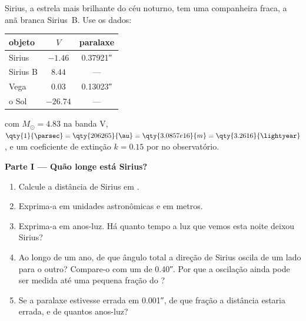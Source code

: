 \begin{problem}
\label{pb:b1:observing-the-sky:1}
Sirius, a estrela mais brilhante do céu noturno, tem uma companheira fraca, a anã branca Sirius~B. Use os dados:
\begin{center}
\small
\begin{tabular}{lcc}
\hline
objeto & $V$ & paralaxe \\
\hline
Sirius & $-1.46$ & \ang{;;0.37921} \\
Sirius B & $8.44$ & --- \\
Vega & $0.03$ & \ang{;;0.13023} \\
o Sol & $-26.74$ & --- \\
\hline
\end{tabular}
\end{center}
com $M_\odot = 4.83$ na banda V, $\qty{1}{\parsec} = \qty{206265}{\au} =
\qty{3.0857e16}{m} = \qty{3.2616}{\lightyear}$, e um coeficiente de extinção $k = 0.15$ por  no observatório.

\medskip
\noindent\textbf{Parte I --- Quão longe está Sirius?}
\begin{enumerate}
  \item Calcule a distância de Sirius em .
  \item Exprima-a em unidades astronômicas e em metros.
  \item Exprima-a em anos-luz. Há quanto tempo a luz que vemos esta noite deixou Sirius?
  \item Ao longo de um ano, de que ângulo total a direção de Sirius oscila de um lado para o outro? Compare-o com um  de \ang{;;0.40}. Por que a oscilação ainda pode ser medida até uma pequena fração do ?
  \item Se a paralaxe estivesse errada em \ang{;;0.001}, de que fração a distância estaria errada, e de quantos anos-luz?
\end{enumerate}


\end{problem}
